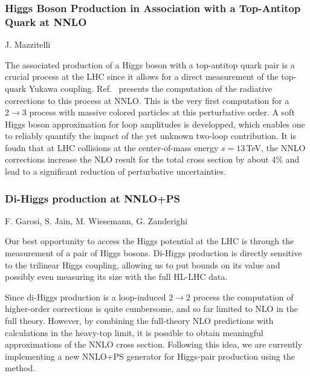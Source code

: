 \documentclass{FBR_Bericht_2025}
\begin{document}
\begin{refsection}
\subsubsection{Higgs Boson Production in Association with a Top-Antitop Quark at NNLO}
\begin{Namen}
 J. Mazzitelli 
\end{Namen}

The associated production of a Higgs boson with a top-antitop quark pair is a crucial process at the LHC since it allows for a direct measurement of the top-quark Yukawa coupling. Ref.~\cite{Catani:2022mfv} presents the computation of the radiative corrections to this process at NNLO. This is the very first computation for a $2 \to 3$  process with massive colored particles at this perturbative order. A soft Higgs boson approximation for loop amplitudes is developped, which enables one to reliably quantify the impact of the yet unknown two-loop contribution. It is foudn that at LHC collisions at the center-of-mass energy $s=13$\,TeV, the NNLO corrections increase the NLO result for the total cross section by about 4\% and lead to a significant reduction of perturbative uncertainties.

\subsubsection{Di-Higgs production at NNLO+PS}
\begin{Namen}
F. Garosi, S. Jain, M. Wiesemann, G. Zanderighi
\end{Namen}
Our best opportunity to access the Higgs potential at the LHC is through the measurement
of a pair of Higgs bosons. Di-Higgs production is directly sensitive to the trilinear Higgs coupling,
allowing us to put bounds on its value and possibly even measuring its size with the full HL-LHC data.

Since di-Higgs production is a loop-induced $2\to 2$ process the computation of higher-order 
corrections is quite cumbersome, and so far limited to NLO in the full theory. However, by combining
the full-theory NLO predictions with calculations in the heavy-top limit, it is possible to obtain 
meaningful approximations of the NNLO cross section. Following this idea, we are currently 
implementing a new NNLO+PS generator for Higgs-pair production using the \minnlo{} method.

%

\end{refsection}
\end{document}
